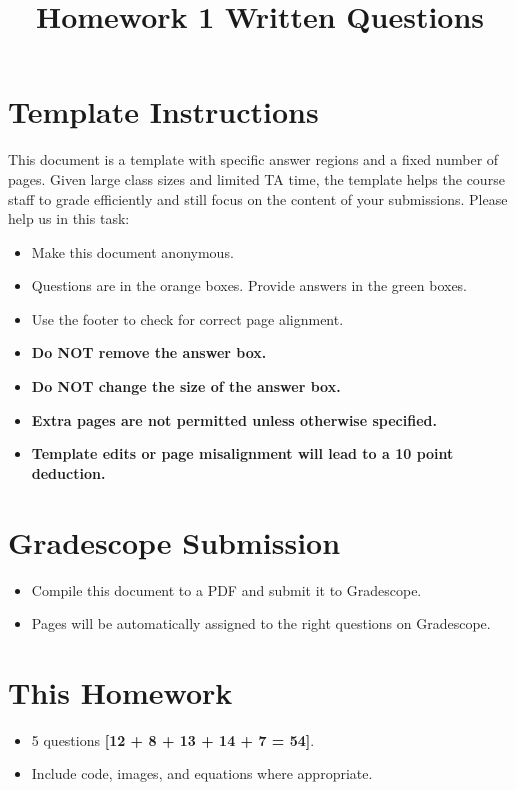 \documentclass[11pt]{article}
\date{}
\title{\vspace{-1cm}Homework 1 Written Questions}
\begin{document}
\maketitle
\thispagestyle{fancy}

\section*{Template Instructions}

This document is a template with specific answer regions and a fixed number of pages. Given large class sizes and limited TA time, the template helps the course staff to grade efficiently and still focus on the content of your submissions. Please help us in this task:
 
\begin{itemize}
  \item Make this document anonymous.
  
  \item Questions are in the orange boxes. Provide answers in the green boxes.
  \item Use the footer to check for correct page alignment.

  \item \textbf{Do NOT remove the answer box.}
  \item \textbf{Do NOT change the size of the answer box.}
  \item \textbf{Extra pages are not permitted unless otherwise specified.}
  \item \textbf{Template edits or page misalignment will lead to a 10 point deduction.}
\end{itemize}

\section*{Gradescope Submission}
\begin{itemize}
  \item Compile this document to a PDF and submit it to Gradescope.
  \item Pages will be automatically assigned to the right questions on Gradescope.
\end{itemize}

\section*{This Homework}
\begin{itemize}
    \item 5 questions \textbf{[12 + 8 + 13 + 14 + 7 = 54]}.
    \item Include code, images, and equations where appropriate.
\end{itemize}
\end{document}
